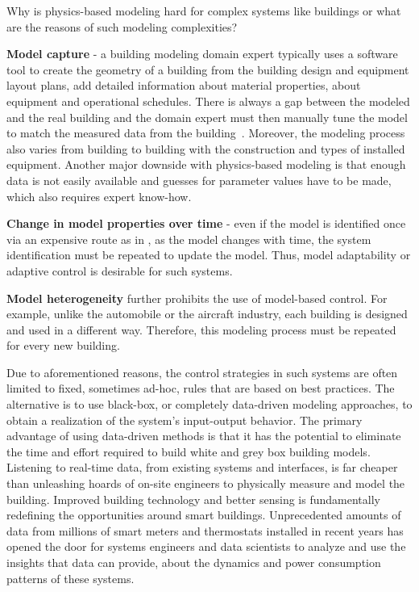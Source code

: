 \textcolor[rgb]{0,0,1}{Why is physics-based modeling hard for complex systems like buildings or what are the reasons of such modeling complexities?}
\begin{enumerate}
	\item \textcolor[rgb]{0,0,1}{\textbf{Model capture} - a building modeling domain expert typically uses a software tool to create the geometry of a building from the building design and equipment layout plans, add detailed information about material properties, about equipment and operational schedules. There is always a gap between the modeled and the real building and the domain expert must then manually tune the model to match the measured data from the building~\cite{New2012}. 
	Moreover, the modeling process also varies from building to building with the construction and types of installed equipment.
	Another major downside with physics-based modeling is that enough data is not easily available and guesses for parameter values have to be made, which also requires expert know-how.
	\item \textbf{Change in model properties over time} - even if the model is identified once via an expensive route as in \cite{Sturzenegger2016}, as the model changes with time, the system identification must be repeated to update the model. Thus, model adaptability or adaptive control is desirable for such systems.
	\item \textbf{Model heterogeneity} further prohibits the use of model-based control. For example, unlike the automobile or the aircraft industry, each building is designed and used in a different way. Therefore, this modeling process must be repeated for every new building. }
\end{enumerate}

\textcolor[rgb]{0,0,1}{Due to aforementioned reasons, the control strategies in such systems are often limited to fixed, sometimes ad-hoc, rules that are based on best practices. 
The alternative is to use black-box, or completely data-driven modeling approaches, to obtain a realization of the system's input-output behavior. 
The primary advantage of using data-driven methods is that it has the potential to eliminate the time and effort required to build white and grey box building models. 
Listening to real-time data, from existing systems and interfaces, is far cheaper than unleashing hoards of on-site engineers to physically measure and model the building. Improved building technology and better sensing is fundamentally redefining the opportunities around smart buildings. 
Unprecedented amounts of data from millions of smart meters and thermostats installed in recent years has opened the door for systems engineers and data scientists to analyze and use the insights that data can provide, about the dynamics and power consumption patterns of these systems. }

